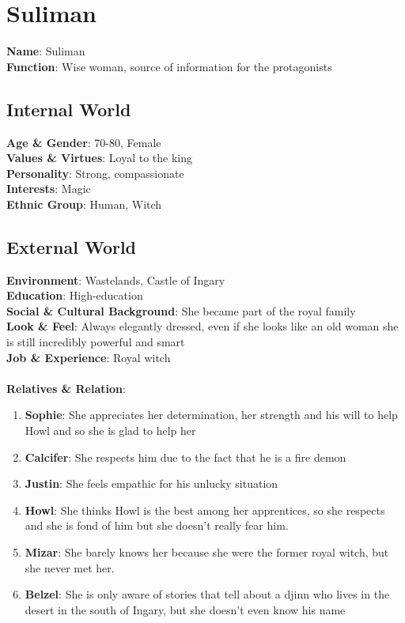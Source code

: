 \section{Suliman}

\textbf{Name}: Suliman\\
\textbf{Function}: Wise woman, source of information for the protagonists

\subsection{Internal World}

\textbf{Age \& Gender}: 70-80, Female \\
\textbf{Values \& Virtues}: Loyal to the king \\
\textbf{Personality}: Strong, compassionate\\
\textbf{Interests}: Magic \\
\textbf{Ethnic Group}: Human, Witch

\subsection{External World}
\textbf{Environment}: Wastelands, Castle of Ingary \\
\textbf{Education}: High-education \\
\textbf{Social \& Cultural Background}: She became part of the royal family \\
\textbf{Look \& Feel}: Always elegantly dressed, even if she looks like an old woman she is still incredibly powerful and smart \\
\textbf{Job \& Experience}: Royal witch\\
\\
\textbf{Relatives \& Relation}:
\begin{enumerate}
\item \textbf{Sophie}: She appreciates her determination, her strength and his will to help Howl and so she is glad to help her
\item \textbf{Calcifer}: She respects him due to the fact that he is a fire demon
\item \textbf{Justin}: She feels empathic for his unlucky situation
\item \textbf{Howl}: She thinks Howl is the best among her apprentices, so she respects and she is fond of him but she doesn't really  fear him.
\item \textbf{Mizar}: She barely knows her because she were the former royal witch, but she never met her.
\item \textbf{Belzel}: She is only aware of stories that tell about a djinn who lives in the desert in the south of Ingary, but she doesn't even know his name
\end{enumerate}

